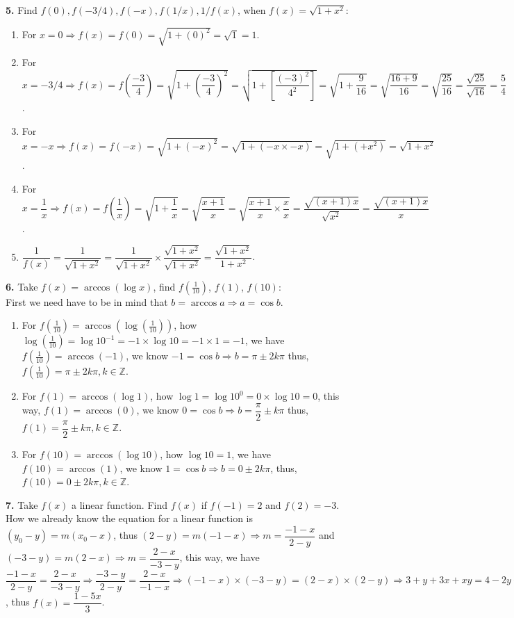 \documentclass{amsart}
\begin{document}
\textbf{5.} Find $f(0), f(-3/4), f(-x), f(1/x), 1/f(x)$, when $f(x)=\sqrt{1+x^2}$:\\
\begin{enumerate}
    \item For $x=0\Rightarrow f(x)=f(0)=\sqrt{1+(0)^2}=\sqrt{1}=1$.
    \item For $x=-3/4\Rightarrow f(x)=f\left(\dfrac{-3}{4}\right)=\sqrt{1+\left(\dfrac{-3}{4}\right)^2}=\sqrt{1+[\dfrac{(-3)^2}{4^2}]}=\sqrt{1+\dfrac{9}{16}}=\sqrt{\dfrac{16+9}{16}}=\sqrt{\dfrac{25}{16}}=\dfrac{\sqrt{25}}{\sqrt{16}}=\dfrac{5}{4}$.
    \item For $x=-x\Rightarrow f(x)=f(-x)=\sqrt{1+(-x)^2}=\sqrt{1+(-x\times-x)}=\sqrt{1+(+x^2)}=\sqrt{1+x^2}$.
    \item For $x=\dfrac{1}{x}\Rightarrow f(x)=f\left(\dfrac{1}{x}\right)=\sqrt{1+\dfrac{1}{x}}=\sqrt{\dfrac{x+1}{x}}=\sqrt{\dfrac{x+1}{x}\times\dfrac{x}{x}}=\dfrac{\sqrt{(x+1)x}}{\sqrt{x^2}}=\dfrac{\sqrt{(x+1)x}}{x}$.
    \item $\dfrac{1}{f(x)}=\dfrac{1}{\sqrt{1+x^2}}=\dfrac{1}{\sqrt{1+x^2}}\times \dfrac{\sqrt{1+x^2}}{\sqrt{1+x^2}}=\dfrac{\sqrt{1+x^2}}{1+x^2}$.
\end{enumerate}

\textbf{6.} Take $f(x)=\arccos{(\log x)}$, find $f\left(\frac{1}{10}\right)$, $f(1)$, $f(10)$:\\
    
    First we need have to be in mind that $b=\arccos{a}\Rightarrow a=\cos{b}$.\\
\begin{enumerate}
    \item For $f\left(\frac{1}{10}\right)=\arccos{\left(\log\left(\frac{1}{10}\right)\right)}$, how $\log\left(\frac{1}{10}\right)=\log 10^{-1}=-1\times \log 10=-1\times1=-1$, we have $f\left(\frac{1}{10}\right)=\arccos{(-1)}$, we know $-1=\cos{b}\Rightarrow b=\pi \pm 2k\pi$ thus, $f\left(\frac{1}{10}\right)=\pi \pm 2k\pi, k\in\mathbb{Z}$.
    \item For $f(1)=\arccos{(\log 1)}$, how $\log 1=\log 10^0=0\times\log10=0$, this way, $f(1)=\arccos{(0)}$, we know $0=\cos{b}\Rightarrow b=\dfrac{\pi}{2} \pm k\pi$ thus, $f(1)=\dfrac{\pi}{2}\pm k\pi, k \in\mathbb{Z}$.
    \item For $f(10)=\arccos{(\log 10)}$, how $\log 10=1$, we have $f(10)=\arccos{(1)}$, we know $1=\cos{b\Rightarrow b=0\pm2k\pi}$, thus, $f(10)=0\pm2k\pi,k\in\mathbb{Z}$.
\end{enumerate}

\textbf{7.} Take $f(x)$ a linear function. Find $f(x)$ if $f(-1)=2$ and $f(2)=-3$.
How we already know the equation for a linear function is $(y_0-y)=m(x_0-x)$, thus $(2-y)=m(-1-x)\Rightarrow m=\dfrac{-1-x}{2-y}$ and $(-3-y)=m(2-x)\Rightarrow m=\dfrac{2-x}{-3-y}$, this way, we have $\dfrac{-1-x}{2-y}=\dfrac{2-x}{-3-y}\Rightarrow\dfrac{-3-y}{2-y}=\dfrac{2-x}{-1-x}\Rightarrow (-1-x)\times(-3-y)=(2-x)\times(2-y)\Rightarrow3+y+3x+xy=4-2y-2x+xy\Rightarrow y+2y=4-3-2x-3x\Rightarrow 3y=1-5x\Rightarrow y=\dfrac{1-5x}{3}$, thus $f(x)=\dfrac{1-5x}{3}$.
\end{document}
